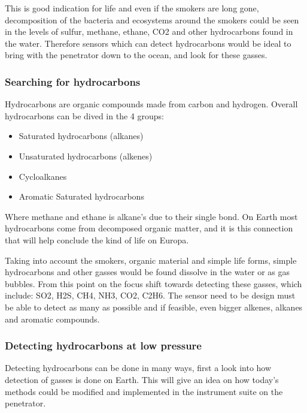 This is good indication for life and even if the smokers are long gone, decomposition of the bacteria and ecosystems around the smokers could be seen in the levels of sulfur, methane, ethane, CO2 and other hydrocarbons found in the water. Therefore sensors which can detect hydrocarbons would be ideal to bring with the penetrator down to the ocean, and look for these gasses.

\subsubsection{Searching for hydrocarbons}

Hydrocarbons are organic compounds made from carbon and hydrogen. Overall hydrocarbons can be dived in the 4 groups:
\begin{itemize}
  \item Saturated hydrocarbons (alkanes)
  \item Unsaturated hydrocarbons (alkenes)
  \item Cycloalkanes
  \item Aromatic Saturated hydrocarbons
\end{itemize}
Where methane and ethane is alkane's due to their single bond. On Earth most hydrocarbons come from decomposed organic matter, and it is this connection that will help conclude the kind of life on Europa.

Taking into account the smokers, organic material and simple life forms, simple hydrocarbons and other gasses would be found dissolve in the water or as gas bubbles. From this point on the focus shift towards detecting these gasses, which include: SO2, H2S, CH4, NH3, CO2, C2H6. The sensor need to be design must be able to detect as many as possible and if feasible, even bigger alkenes, alkanes and aromatic compounds.

\subsubsection{Detecting hydrocarbons at low pressure}

Detecting hydrocarbons can be done in many ways, first a look into how detection of gasses is done on Earth. This will give an idea on how today's methods could be modified and implemented in the instrument suite on the penetrator.

